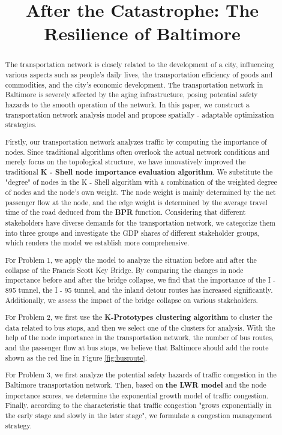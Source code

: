 \documentclass{mcmthesis}
\title{After the Catastrophe: The Resilience of Baltimore}%
\begin{document}
\begin{abstract}

  The transportation network is closely related to the development of a city, influencing various aspects such as people's daily lives, the transportation efficiency of goods and commodities, and the city's economic development. The transportation network in Baltimore is severely affected by the aging infrastructure, posing potential safety hazards to the smooth operation of the network. In this paper, we construct a transportation network analysis model and propose spatially - adaptable optimization strategies.

    Firstly, our transportation network analyzes traffic by computing the importance of nodes. Since traditional algorithms often overlook the actual network conditions and merely focus on the topological structure, we have innovatively improved the traditional \textbf{K - Shell node importance evaluation algorithm}. We substitute the "degree" of nodes in the K - Shell algorithm with a combination of the weighted degree of nodes and the node's own weight. The node weight is mainly determined by the net passenger flow at the node, and the edge weight is determined by the average travel time of the road deduced from the \textbf{BPR} function. Considering that different stakeholders have diverse demands for the transportation network, we categorize them into three groups and investigate the GDP shares of different stakeholder groups, which renders the model we establish more comprehensive.
    
    For Problem 1, we apply the model to analyze the situation before and after the collapse of the Francis Scott Key Bridge. By comparing the changes in node importance before and after the bridge collapse, we find that the importance of the I - 895 tunnel, the I - 95 tunnel, and the inland detour routes has increased significantly. Additionally, we assess the impact of the bridge collapse on various stakeholders.
    
    For Problem 2, we first use the \textbf{K-Prototypes clustering algorithm} to cluster the data related to bus stops, and then we select one of the clusters for analysis. With the help of the node importance in the transportation network, the number of bus routes, and the passenger flow at bus stops, we believe that Baltimore should add the route shown as the red line in Figure \ref{fig:busroute}.
    
    For Problem 3, we first analyze the potential safety hazards of traffic congestion in the Baltimore transportation network. Then, based on \textbf{the LWR model} and the node importance scores, we determine the exponential growth model of traffic congestion. Finally, according to the characteristic that traffic congestion "grows exponentially in the early stage and slowly in the later stage", we formulate a congestion management strategy.
    

\end{abstract}
\end{document}
